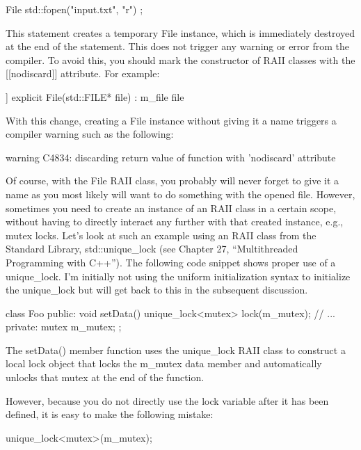 \begin{cpp}
File { std::fopen("input.txt", "r") };
\end{cpp}

This statement creates a temporary File instance, which is immediately destroyed at the end of the statement. This does not trigger any warning or error from the compiler. To avoid this, you should mark the constructor of RAII classes with the [[nodiscard]] attribute. For example:

\begin{cpp}
[[nodiscard]] explicit File(std::FILE* file) : m_file{ file } { }
\end{cpp}

With this change, creating a File instance without giving it a name triggers a compiler warning such as the following:

\begin{shell}
warning C4834: discarding return value of function with 'nodiscard' attribute
\end{shell}

Of course, with the File RAII class, you probably will never forget to give it a name as you most likely will want to do something with the opened file. However, sometimes you need to create an instance of an RAII class in a certain scope, without having to directly interact any further with that created instance, e.g., mutex locks. Let’s look at such an example using an RAII class from the Standard Library, std::unique\_lock (see Chapter 27, “Multithreaded Programming with C++”). The following code snippet shows proper use of a unique\_lock. I’m initially not using the uniform initialization syntax to initialize the unique\_lock but will get back to this in the subsequent discussion.

\begin{cpp}
class Foo
{
    public:
        void setData()
        {
            unique_lock<mutex> lock(m_mutex);
            // ...
        }
    private:
        mutex m_mutex;
};
\end{cpp}

The setData() member function uses the unique\_lock RAII class to construct a local lock object that locks the m\_mutex data member and automatically unlocks that mutex at the end of the function.

However, because you do not directly use the lock variable after it has been defined, it is easy to make the following mistake:

\begin{cpp}
unique_lock<mutex>(m_mutex);
\end{cpp}

